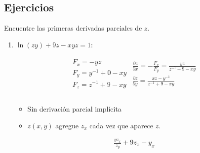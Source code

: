 \subsection{Ejercicios}
Encuentre las primeras derivadas parciales de $z$.
\begin{enumerate}
    \item $\ln(zy)+9z-xyz = 1 $:
        \begin{center}
           \begin{align*}
               \begin{matrix}
                   F_x = -yz \\ 
                   F_y = y^{-1}+0-xy \\ 
                   F_z = z^{-1}+9-xy \\ 
               \end{matrix}
               \begin{matrix}
                   \frac{\partial z}{\partial x} = -\frac{F_x}{F_y} = \frac{yz}{z^{-1}+9-xy} \\ 
                   \frac{\partial z}{\partial y} = \frac{xz-y^{-1}}{z^{-1}+9-xy} \\    
               \end{matrix} \\ 
           \end{align*}
        \begin{itemize}[label=\#]
            \item Sin derivación parcial implícita
            \item $z(x,y)$ agregue $z_x$ cada vez que aparece $z$.
        \end{itemize}
        \begin{align*}
            \frac{yz_x}{z_y} + 9 z_x - y_x
        \end{align*}
        \end{center}
\end{enumerate}
































